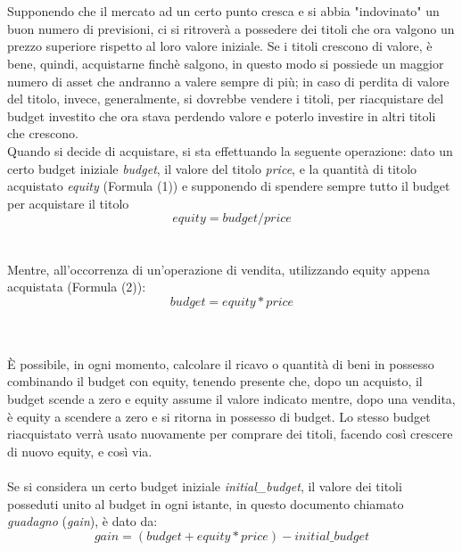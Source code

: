 \documentclass[a4paper,12pt]{report}
\begin{document}
\\~\\
Supponendo che il mercato ad un certo punto cresca e si abbia "indovinato" un buon numero di previsioni, ci si ritroverà a possedere dei titoli che ora valgono un prezzo superiore rispetto al loro valore iniziale. Se i titoli crescono di valore, è bene, quindi, acquistarne finchè salgono, in questo modo si possiede un maggior numero di asset che andranno a valere sempre di più; in caso di perdita di valore del titolo, invece, generalmente, si dovrebbe vendere i titoli, per riacquistare del budget investito che ora stava perdendo valore e poterlo investire in altri titoli che crescono.\\
Quando si decide di acquistare, si sta effettuando la seguente operazione: dato un certo budget iniziale \textit{budget}, il valore del titolo \textit{price}, e la quantità di titolo acquistato \textit{equity} (Formula (1)) e supponendo di spendere sempre tutto il budget per acquistare il titolo
\\

\begin{equation}
equity=budget/price
\end{equation}
\\~\\
Mentre, all'occorrenza di un'operazione di vendita, utilizzando equity appena acquistata (Formula (2)):\\

\begin{equation}
budget=equity*price
\end{equation}

\\~\\
È possibile, in ogni momento, calcolare il ricavo o quantità di beni in possesso combinando il budget con equity, tenendo presente che, dopo un acquisto, il budget scende a zero e equity assume il valore indicato mentre, dopo una vendita, è equity a scendere a zero e si ritorna in possesso di budget. Lo stesso budget riacquistato verrà usato nuovamente per comprare dei titoli, facendo così crescere di nuovo equity, e così via.
\\~\\ 
Se si considera un certo budget iniziale \textit{initial\_budget}, il valore dei titoli posseduti unito al budget in ogni istante, in questo documento chiamato \textit{guadagno} (\textit{gain}), è dato da:
\\
\begin{equation}
gain=(budget+equity*price)-initial\_budget
\end{equation}
\end{document}
